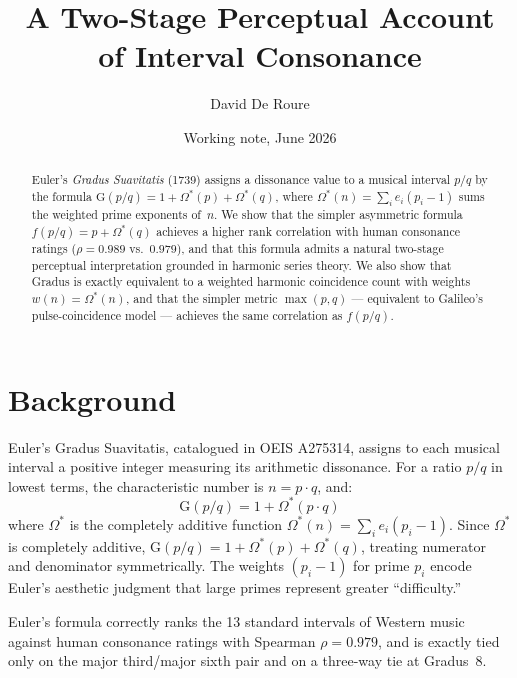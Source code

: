\documentclass[11pt,a4paper]{article}
\title{A Two-Stage Perceptual Account of Interval Consonance}
\author{David De Roure}
\date{Working note, June 2026}
\newcommand{\Os}{\Omega^{*}}
\newcommand{\G}{\mathrm{G}}
\begin{document}
\maketitle


\begin{abstract}
Euler's \emph{Gradus Suavitatis} (1739) assigns a dissonance value to a musical
interval $p/q$ by the formula $\G(p/q) = 1 + \Os(p) + \Os(q)$, where
$\Os(n) = \sum_i e_i(p_i - 1)$ sums the weighted prime exponents of~$n$.
We show that the simpler asymmetric formula $f(p/q) = p + \Os(q)$ achieves
a higher rank correlation with human consonance ratings ($\rho = 0.989$
vs.\ $0.979$), and that this formula admits a natural two-stage perceptual
interpretation grounded in harmonic series theory. We also show that Gradus
is exactly equivalent to a weighted harmonic coincidence count with weights
$w(n) = \Os(n)$, and that the simpler metric $\max(p,q)$ --- equivalent to
Galileo's pulse-coincidence model --- achieves the same correlation as
$f(p/q)$.
\end{abstract}


\section{Background}

Euler's Gradus Suavitatis, catalogued in OEIS A275314, assigns to each musical
interval a positive integer measuring its arithmetic dissonance. For a ratio
$p/q$ in lowest terms, the characteristic number is $n = p \cdot q$, and:
\[
  \G(p/q) = 1 + \Os(p \cdot q)
\]
where $\Os$ is the completely additive function $\Os(n) = \sum_i e_i(p_i - 1)$.
Since $\Os$ is completely additive, $\G(p/q) = 1 + \Os(p) + \Os(q)$, treating
numerator and denominator symmetrically. The weights $(p_i - 1)$ for prime
$p_i$ encode Euler's aesthetic judgment that large primes represent greater
``difficulty.''

Euler's formula correctly ranks the 13 standard intervals of Western music
against human consonance ratings \cite{krumhansl1990} with Spearman
$\rho = 0.979$, and is exactly tied only on the major third/major sixth pair
and on a three-way tie at Gradus~8.

\end{document}

